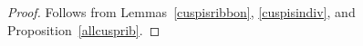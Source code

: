 \begin{proof}
Follows from Lemmas~\ref{cuspisribbon}, \ref{cuspisindiv}, and Proposition~\ref{allcusprib}.
\end{proof}
